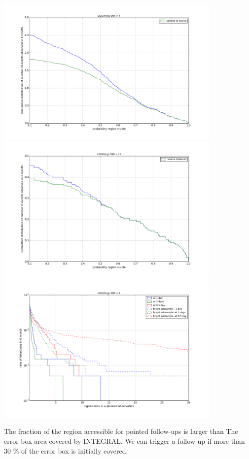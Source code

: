 \documentclass[a0,portrait]{a0poster}
\begin{document}
\begin{multicols}{2}
\begin{center}
    \includegraphics[width=11cm]{figures/covered_region_4-1.png}
    \includegraphics[width=11cm]{figures/covered_region_12-1.png}
    \includegraphics[width=11cm]{figures/ag_flux_4.png}
    \label{covered_region}
\end{center}

The fraction of the region accessible for pointed follow-ups is larger than The
error-box area covered by INTEGRAL. We can trigger a follow-up if more than 30
\% of the error box is initially covered.


\end{multicols}
\end{document}
